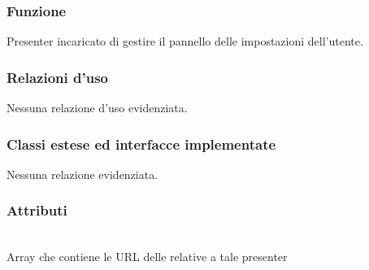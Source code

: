 \subsubsection*{Funzione}
Presenter incaricato di gestire il pannello delle impostazioni dell'utente.

\subsubsection*{Relazioni d'uso}
Nessuna relazione d'uso evidenziata.

\subsubsection*{Classi estese ed interfacce implementate}
Nessuna relazione evidenziata.

\subsubsection*{Attributi}
\begin{description}
\item{}\\
Array che contiene le URL delle  relative a tale presenter
\end{description}

